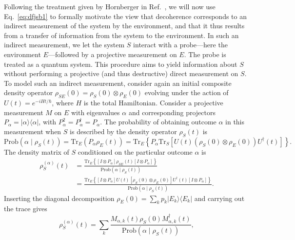 \documentclass[3p,sort&compress]{elsarticle}
\newcommand{\ketbra}[2]{\ensuremath{|{#1 \rangle}{\langle #2}|}}
\newcommand{\E}{\ensuremath{e}}
\newcommand{\I}{\ensuremath{i}}
\newcommand{\op}[1]{#1}
\begin{document}
Following the treatment given by Hornberger in Ref.~\cite{Hornberger:2009:aq}, we will now use Eq.~\eqref{eq:dfjsb1} to formally motivate the view that decoherence corresponds to an indirect measurement of the system by the environment, and that it thus results from a transfer of information from the system to the environment. In such an indirect measurement, we let the system $S$ interact with a probe---here the environment $E$---followed by a projective measurement on $E$. The probe is treated as a quantum system. This procedure aims to yield information about $S$ without performing a projective (and thus destructive) direct measurement on $S$. To model such an indirect measurement, consider again an initial composite density operator $\op{\rho}_{SE}(0) = \op{\rho}_S(0) \otimes \op{\rho}_E(0)$ evolving under the action of $U(t) = \E^{-\I H t/\hbar}$, where $H$ is the total Hamiltonian. Consider a projective measurement $M$ on $E$ with eigenvalues $\alpha$ and corresponding projectors $P_\alpha = \ketbra{\alpha}{\alpha}$, with $P_\alpha^2=P_\alpha^\dagger=P_\alpha$. The probability of obtaining outcome $\alpha$ in this measurement when $S$ is described by the density operator $\op{\rho}_S(t)$ is
%
\begin{equation}
 \text{Prob}\left(\alpha \mid \op{\rho}_S(t) \right) = \text{Tr}_E \left( P_\alpha \op{\rho}_E(t) \right) = \text{Tr}_E \left\{ P_\alpha \text{Tr}_S \left[ U(t) \left( \op{\rho}_S(0) \otimes \op{\rho}_E(0) \right) U^\dagger(t)\right] \right\}.
\end{equation}
%
The density matrix of $S$ conditioned on the particular outcome $\alpha$ is
%
\begin{align}
\op{\rho}_S^{(\alpha)}(t) &= 
\frac{ \text{Tr}_E \left\{ \left[I \otimes P_\alpha \right] \op{\rho}_{SE}(t) \left[I \otimes P_\alpha \right] \right\}}{\text{Prob}\left(\alpha \mid \op{\rho}_S(t)\right)}\nonumber\\
&=\frac{ \text{Tr}_E \left\{ \left[I \otimes P_\alpha \right] U(t) \left[ \op{\rho}_S(0) \otimes \op{\rho}_E(0) \right] U^\dagger(t)  \left[I \otimes P_\alpha \right] \right\}}{\text{Prob}\left(\alpha \mid \op{\rho}_S(t)\right)}.\label{eq:hiuvb}
\end{align}
%
Inserting the diagonal decomposition $\op{\rho}_E(0) = \sum_k p_k \ketbra{E_k}{E_k}$ and carrying out the trace gives \cite{Hornberger:2009:aq}
%
\begin{equation}\label{eq:hiuvbxxxxx}
\op{\rho}_S^{(\alpha)}(t) = \sum_k \frac{ M_{\alpha,k}(t)  \op{\rho}_S(0) M^\dagger_{\alpha,k}(t)}{\text{Prob}\left(\alpha \mid \op{\rho}_S(t)\right)},
\end{equation}
\end{document}
